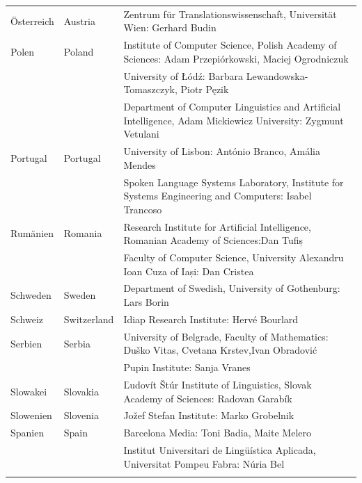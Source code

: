 \begin{longtable}{@{}llp{113mm}@{}}
  Österreich & \textcolor{grey1}{Austria} & Zentrum für Translationswissenschaft, Universität Wien: Gerhard Budin\\ \addlinespace 
  Polen & \textcolor{grey1}{Poland} & Institute of Computer Science, Polish Academy of Sciences: Adam Przepiórkowski, Maciej Ogrodniczuk \\ \addlinespace
  & & University of Łódź: Barbara Lewandowska-Tomaszczyk, Piotr Pęzik\\ \addlinespace
  & & Department of Computer Linguistics and Artificial Intelligence, Adam Mickiewicz University: Zygmunt Vetulani \\ \addlinespace
  Portugal & \textcolor{grey1}{Portugal} & University of Lisbon: António Branco, Amália Mendes \\ \addlinespace
  & & Spoken Language Systems Laboratory, Institute for Systems Engineering and Computers: Isabel Trancoso \\ \addlinespace
  Rumänien & \textcolor{grey1}{Romania} & Research Institute for Artificial Intelligence, Romanian Academy of Sciences:\newline Dan Tufiș \\ \addlinespace
  & & Faculty of Computer Science, University Alexandru Ioan Cuza of Iași: Dan Cristea \\ \addlinespace
  Schweden & \textcolor{grey1}{Sweden} & Department of Swedish, University of Gothenburg: Lars Borin \\ \addlinespace 
  Schweiz & \textcolor{grey1}{Switzerland} & Idiap Research Institute: Hervé Bourlard \\ \addlinespace 
  Serbien & \textcolor{grey1}{Serbia} & University of Belgrade, Faculty of Mathematics: Duško Vitas, Cvetana Krstev,\newline Ivan Obradović \\ \addlinespace
  & & Pupin Institute: Sanja Vranes \\ \addlinespace  
  Slowakei & \textcolor{grey1}{Slovakia} & Ľudovít Štúr Institute of Linguistics, Slovak Academy of Sciences: Radovan Garabík \\ \addlinespace 
  Slowenien & \textcolor{grey1}{Slovenia} & Jožef Stefan Institute: Marko Grobelnik \\ \addlinespace 
  Spanien & \textcolor{grey1}{Spain} & Barcelona Media: Toni Badia, Maite Melero \\ \addlinespace 
  & & Institut Universitari de Lingüística Aplicada, Universitat Pompeu Fabra: Núria Bel \\ \addlinespace 

\end{longtable}
